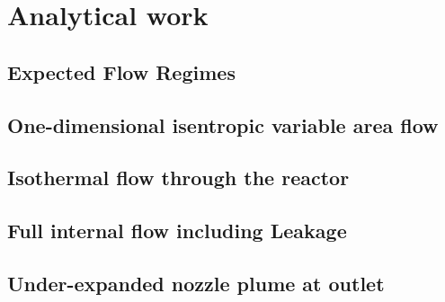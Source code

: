 \section{Analytical work}

\subsection{Expected Flow Regimes}

\newpage

\subsection{One-dimensional isentropic variable area flow}

\newpage

\subsection{Isothermal flow through the reactor}

\newpage

\subsection{Full internal flow including Leakage}

\newpage

\subsection{Under-expanded nozzle plume at outlet}

\newpage

